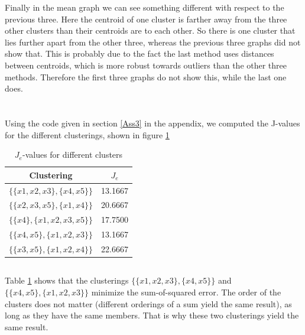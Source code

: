 \documentclass[10pt]{article}
\begin{document}
Finally in the mean graph we can see something different with respect to the previous three. Here the centroid of one cluster is farther away from the three other clusters than their centroids are to each other. So there is one cluster that lies further apart from the other three, whereas the previous three graphs did not show that. This is probably due to the fact the last method uses distances between centroids, which is more robust towards outliers than the other three methods. Therefore the first three graphs do not show this, while the last one does.

\section{}
\subsection{}
Using the code given in section \ref{Ass3} in the appendix, we computed the J-values for the different clusterings, shown in figure \ref{tab1}
\begin{table}[H]
	\centering
	\caption{$J_e$-values for different clusters}
	\label{tab1}
	\begin{tabular}{c|c}
		Clustering & $J_e$ \\
		\hline
		$\{\{x1, x2, x3\}, \{x4, x5\}\}$ & 13.1667\\
		$\{\{x2, x3, x5\}, \{x1, x4\}\}$ & 20.6667\\
		$\{\{x4\}, \{x1, x2, x3, x5\}\}$ & 17.7500\\
		$\{\{x4, x5\}, \{x1, x2, x3\}\}$ & 13.1667\\
		$\{\{x3, x5\}, \{x1, x2, x4\}\}$ & 22.6667
	\end{tabular}
\end{table}

\subsection{}
Table \ref{tab1} shows that the clusterings $\{\{x1, x2, x3\}, \{x4, x5\}\}$ and $\{\{x4, x5\}, \{x1, x2, x3\}\}$ minimize the sum-of-squared error. The order of the clusters does not matter (different orderings of a sum yield the same result), as long as they have the same members. That is why these two clusterings yield the same result. 

\section{}
\end{document}
